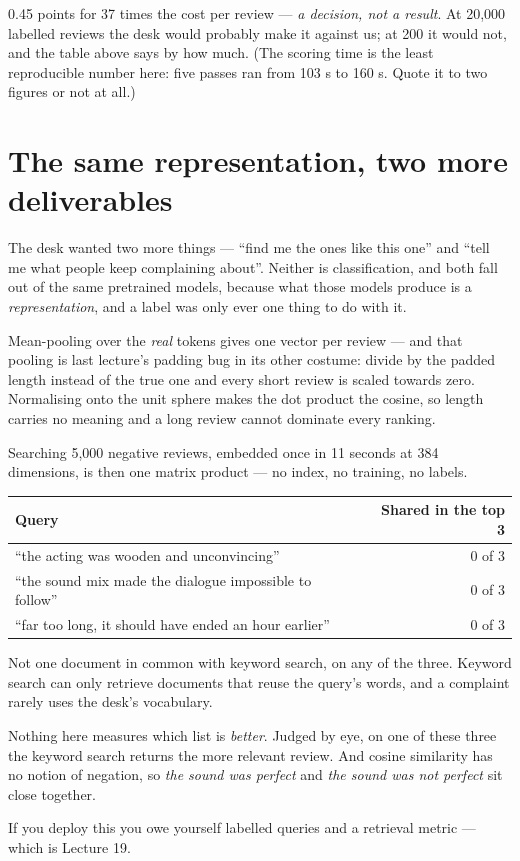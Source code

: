 \documentclass[11pt,a4paper]{article}
\begin{document}
0.45 points for 37 times the cost per review --- \emph{a decision, not a
result}. At 20{,}000 labelled reviews the desk would probably make it against
us; at 200 it would not, and the table above says by how much. (The scoring
time is the least reproducible number here: five passes ran from 103 s to 160
s. Quote it to two figures or not at all.)

\section{The same representation, two more deliverables}

The desk wanted two more things --- ``find me the ones like this one'' and
``tell me what people keep complaining about''. Neither is classification, and
both fall out of the same pretrained models, because what those models produce
is a \emph{representation}, and a label was only ever one thing to do with it.

Mean-pooling over the \emph{real} tokens gives one vector per review --- and
that pooling is last lecture's padding bug in its other costume: divide by the
padded length instead of the true one and every short review is scaled towards
zero. Normalising onto the unit sphere makes the dot product the cosine, so
length carries no meaning and a long review cannot dominate every ranking.

Searching 5{,}000 negative reviews, embedded once in 11 seconds at 384
dimensions, is then one matrix product --- no index, no training, no labels.

\begin{center}
\small
\begin{tabular}{lr}
\toprule
\textbf{Query} & \textbf{Shared in the top 3} \\
\midrule
``the acting was wooden and unconvincing'' & 0 of 3 \\
``the sound mix made the dialogue impossible to follow'' & 0 of 3 \\
``far too long, it should have ended an hour earlier'' & 0 of 3 \\
\bottomrule
\end{tabular}
\end{center}

Not one document in common with keyword search, on any of the three. Keyword
search can only retrieve documents that reuse the query's words, and a
complaint rarely uses the desk's vocabulary.

\begin{failbox}[title={Failure condition --- that is a difference, not a victory}]
Nothing here measures which list is \emph{better}. Judged by eye, on one of
these three the keyword search returns the more relevant review. And cosine
similarity has no notion of negation, so \emph{the sound was perfect} and
\emph{the sound was not perfect} sit close together.

If you deploy this you owe yourself labelled queries and a retrieval metric ---
which is Lecture 19.
\end{failbox}
\end{document}
